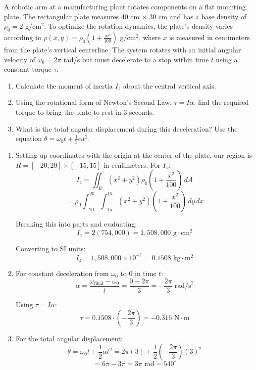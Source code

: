 \exampleline
\begin{example}
A robotic arm at a manufacturing plant rotates components on a flat mounting plate. The rectangular plate measures 40 cm × 30 cm and has a base density of $\rho_0 = 2$ g/cm$^2$. To optimize the rotation dynamics, the plate's density varies according to $\rho(x,y) = \rho_0(1 + \frac{x^2}{100})$ g/cm$^2$, where $x$ is measured in centimeters from the plate's vertical centerline. The system rotates with an initial angular velocity of $\omega_0 = 2\pi$ rad/s but must decelerate to a stop within time $t$ using a constant torque $\tau$.

\begin{enumerate}
   \item Calculate the moment of inertia $I_z$ about the central vertical axis.
   \item Using the rotational form of Newton's Second Law, $\tau = I\alpha$, find the required torque to bring the plate to rest in 3 seconds.
   \item What is the total angular displacement during this deceleration? Use the equation $\theta = \omega_0t + \frac{1}{2}\alpha t^2$.
\end{enumerate}

\begin{solution}
\begin{enumerate}
   \item Setting up coordinates with the origin at the center of the plate, our region is $R = [-20,20] \times [-15,15]$ in centimeters. For $I_z$:
   \[
   I_z = \iint_R (x^2 + y^2)\rho_0\left(1 + \frac{x^2}{100}\right)\,dA
   \]
   \[
   = \rho_0\int_{-20}^{20}\int_{-15}^{15}(x^2 + y^2)\left(1 + \frac{x^2}{100}\right)\,dy\,dx
   \]
   
   Breaking this into parts and evaluating:
   \[
   I_z = 2(754,000) = 1,508,000 \text{ g}\cdot\text{cm}^2
   \]
   
   Converting to SI units:
   \[
   I_z = 1,508,000 \times 10^{-7} = 0.1508 \text{ kg}\cdot\text{m}^2
   \]

   \item For constant deceleration from $\omega_0$ to 0 in time $t$:
   \[
   \alpha = \frac{\omega_\text{final} - \omega_0}{t} = \frac{0 - 2\pi}{3} = -\frac{2\pi}{3} \text{ rad/s}^2
   \]
   
   Using $\tau = I\alpha$:
   \[
   \tau = 0.1508 \cdot \left(-\frac{2\pi}{3}\right) = -0.316 \text{ N}\cdot\text{m}
   \]

   \item For the total angular displacement:
   \[
   \theta = \omega_0t + \frac{1}{2}\alpha t^2 = 2\pi(3) + \frac{1}{2}\left(-\frac{2\pi}{3}\right)(3)^2
   \]
   \[
   = 6\pi - 3\pi = 3\pi \text{ rad} = 540^\circ
   \]
\end{enumerate}
\end{solution}
\end{example}
\exampleline


